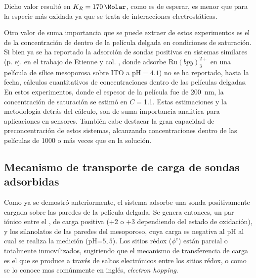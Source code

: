 		Dicho valor resultó en $K_R=\SI{170}{\per\Molar}$, como es de esperar, es menor que para la especie más oxidada ya que se trata de interacciones electrostáticas. 

		Otro valor de suma importancia que se puede extraer de estos experimentos es el de la concentración de \ru\space dentro de la película delgada en condiciones de saturación. Si bien ya se ha reportado la adsorción de sondas positivas en sistemas similares (p. ej. en el trabajo de Etienne y col. \cite{Etienne2007}, donde adsorbe $\text{Ru}(bpy)_3^{2+}$ en una película de sílice mesoporosa sobre ITO a $\text{pH}=4.1$) no se ha reportado, hasta la fecha, cálculos cuantitativos de concentraciones dentro de las películas delgadas. En estos experimentos, donde el espesor de la película fue de \SI{200}{nm}, la concentración de saturación se estimó en $C\!=$\SI{1.1}{\Molar}. Estas estimaciones y la metodología detrás del cálculo, son de suma importancia analitica para aplicaciones en sensores. También cabe destacar la gran capacidad de preconcentración de estos sistemas, alcanzando concentraciones dentro de las películas de 1000 o más veces que en la solución.
		
	\subsection{Mecanismo de transporte de carga de sondas adsorbidas}

	 	 Como ya se demostró anteriormente, el sistema adsorbe una sonda positivamente cargada sobre las paredes de la película delgada. Se genera entonces, un par iónico entre el \ru, de carga positiva (+2 o +3 dependiendo del estado de oxidación), y los silanolatos de las paredes del mesoporoso, cuya carga es negativa al pH al cual se realiza la medición (pH=$5,5$). Los sitios rédox ($\phi^{e}$) están parcial o totalmente inmovilizados, sugiriendo que el mecanismo de transferencia de carga es el que se produce a través de saltos electrónicos entre los sitios rédox, o como se lo conoce mas comúnmente en inglés, \textit{electron hopping}. \cite{Rohlfing2005,Vila2015,Audebert2015}

